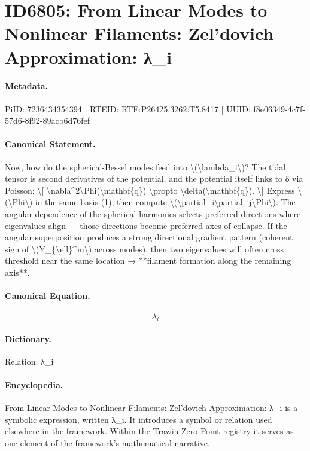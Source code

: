 \section*{ID6805: From Linear Modes to Nonlinear Filaments: Zel’dovich Approximation: λ\_i}
\paragraph{Metadata.}
PiID: 7236434354394 | RTEID: RTE:P26425.3262:T5.8417 | UUID: f8e06349-4c7f-57d6-8f92-89acb6d76fef

\paragraph{Canonical Statement.}
Now, how do the spherical-Bessel modes feed into \textbackslash{}(\textbackslash{}lambda\_i\textbackslash{})? The tidal tensor is second derivatives of the potential, and the potential itself links to δ via Poisson: \textbackslash{}[ \textbackslash{}nabla\textasciicircum{}2\textbackslash{}Phi(\textbackslash{}mathbf\{q\}) \textbackslash{}propto \textbackslash{}delta(\textbackslash{}mathbf\{q\}). \textbackslash{}] Express \textbackslash{}(\textbackslash{}Phi\textbackslash{}) in the same basis (1), then compute \textbackslash{}(\textbackslash{}partial\_i\textbackslash{}partial\_j\textbackslash{}Phi\textbackslash{}). The angular dependence of the spherical harmonics selects preferred directions where eigenvalues align — those directions become preferred axes of collapse. If the angular superposition produces a strong directional gradient pattern (coherent sign of \textbackslash{}(Y\_\{\textbackslash{}ell\}\textasciicircum{}m\textbackslash{}) across modes), then two eigenvalues will often cross threshold near the same location → **filament formation along the remaining axis**.

\paragraph{Canonical Equation.}
\[
\lambda_i
\]

\paragraph{Dictionary.}
Relation: λ\_i

\paragraph{Encyclopedia.}
From Linear Modes to Nonlinear Filaments: Zel’dovich Approximation: λ\_i is a symbolic expression, written λ\_i. It introduces a symbol or relation used elsewhere in the framework. Within the Trawin Zero Point registry it serves as one element of the framework's mathematical narrative.
